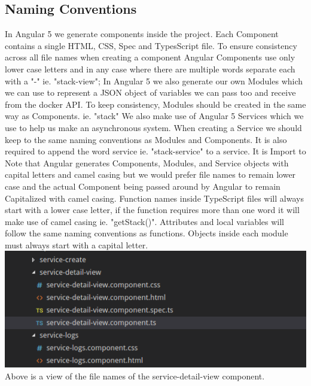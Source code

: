 \documentclass[a4paper]{article}
\begin{document}
\subsection{Naming Conventions}
In Angular 5 we generate components inside the project. Each Component contains a single HTML, CSS, Spec and 
TypesScript file. To ensure consistency across all file names when creating a component Angular 
Components use only lower case letters and in any case where there are multiple words separate each 
with a "-" ie. "stack-view";\newline
In Angular 5 we also generate our own Modules which we can use to represent a JSON object of variables we can pass 
too and receive from the docker API. To keep consistency, Modules should be created in the same way as Components. ie. "stack" \newline
We also make use of Angular 5 Services which we use to help us make an asynchronous system. When creating a Service we should 
keep to the same naming conventions as Modules and Components. It is also required to append the word service ie. "stack-service" to a service. 
It is Import to Note that Angular generates Components, Modules, and Service objects with capital letters and camel 
casing but we would prefer file names to remain lower case and the actual Component being passed around by Angular to 
remain Capitalized with camel casing.
\newline\newline
Function names inside TypeScript files will always start with a lower case letter, if the function requires more 
than one word it will make use of camel casing ie. "getStack()". 
Attributes and local variables will follow the same naming conventions as functions. 
\newline 
Objects inside each module must always start with a capital letter. 
\newline\newline
\includegraphics[scale=0.5]{file_name.png} \newline\\
Above is a view of the file names of the service-detail-view component. 
\end{document}
